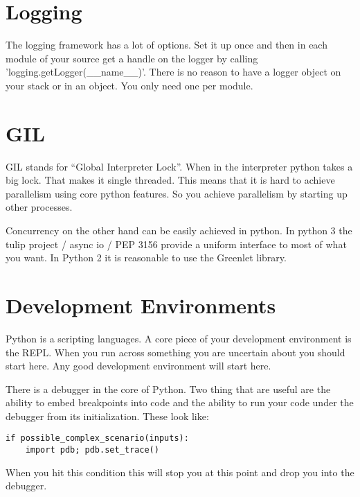 \documentclass[]{article}
\begin{document}
\section{Logging}

The logging framework has a lot of options.  Set it up once and then in each module
of your source get a handle on the logger by calling 'logging.getLogger({\_\_}name{\_}{\_})'.  
There is no reason to have a logger object on your stack or in an object.  You only
need one per module.

\section{GIL}

GIL stands for ``Global Interpreter Lock''. When in the interpreter
python takes a big lock. That makes it single threaded. This means
that it is hard to achieve parallelism using core python features. So
you achieve parallelism by starting up other processes.

Concurrency on the other hand can be easily achieved in python.
In python 3 the tulip project / async io / PEP 3156 provide a uniform interface
to most of what you want.  In Python 2 it is reasonable to use the Greenlet library.

\section{Development Environments}

Python is a scripting languages. A core piece of your development
environment is the REPL. When you run across something you are
uncertain about you should start here. Any good development environment
will start here.

There is a debugger in the core of Python. Two thing that are useful
are the ability to embed breakpoints into code and the ability to run
your code under the debugger from its initialization. These look like:

\begin{verbatim}
if possible_complex_scenario(inputs):
    import pdb; pdb.set_trace()
\end{verbatim}

When you hit this condition this will stop you at this point and drop
you into the debugger.
\end{document}
